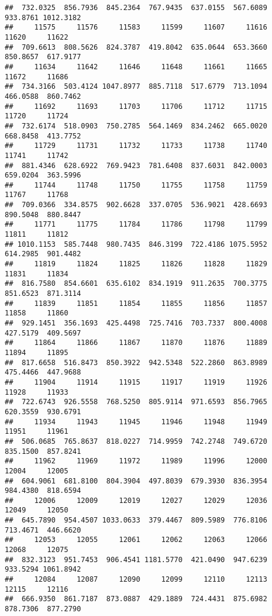 \documentclass[
]{article}
\begin{document}
\begin{verbatim}
##  732.0325  856.7936  845.2364  767.9435  637.0155  567.6089  933.8761 1012.3182 
##     11575     11576     11583     11599     11607     11616     11620     11622 
##  709.6613  808.5626  824.3787  419.8042  635.0644  653.3660  850.8657  617.9177 
##     11634     11642     11646     11648     11661     11665     11672     11686 
##  734.3166  503.4124 1047.8977  885.7118  517.6779  713.1094  466.0588  860.7462 
##     11692     11693     11703     11706     11712     11715     11720     11724 
##  732.6174  518.0903  750.2785  564.1469  834.2462  665.0020  668.8458  413.7752 
##     11729     11731     11732     11733     11738     11740     11741     11742 
##  881.4346  628.6922  769.9423  781.6408  837.6031  842.0003  659.0204  363.5996 
##     11744     11748     11750     11755     11758     11759     11767     11768 
##  709.0366  334.8575  902.6628  337.0705  536.9021  428.6693  890.5048  880.8447 
##     11771     11775     11784     11786     11798     11799     11811     11812 
## 1010.1153  585.7448  980.7435  846.3199  722.4186 1075.5952  614.2985  901.4482 
##     11819     11824     11825     11826     11828     11829     11831     11834 
##  816.7580  854.6601  635.6102  834.1919  911.2635  700.3775  851.6523  871.3114 
##     11839     11851     11854     11855     11856     11857     11858     11860 
##  929.1451  356.1693  425.4498  725.7416  703.7337  800.4008  427.5179  409.5697 
##     11864     11866     11867     11870     11876     11889     11894     11895 
##  817.6658  516.8473  850.3922  942.5348  522.2860  863.8989  475.4466  447.9688 
##     11904     11914     11915     11917     11919     11926     11928     11933 
##  722.6743  926.5558  768.5250  805.9114  971.6593  856.7965  620.3559  930.6791 
##     11934     11943     11945     11946     11948     11949     11951     11961 
##  506.0685  765.8637  818.0227  714.9959  742.2748  749.6720  835.1500  857.8241 
##     11962     11969     11972     11989     11996     12000     12004     12005 
##  604.9061  681.8100  804.3904  497.8039  679.3930  836.3954  984.4380  818.6594 
##     12006     12009     12019     12027     12029     12036     12049     12050 
##  645.7890  954.4507 1033.0633  379.4467  809.5989  776.8106  713.4671  446.6620 
##     12053     12055     12061     12062     12063     12066     12068     12075 
##  832.3123  951.7453  906.4541 1181.5770  421.0490  947.6239  933.5294 1061.8942 
##     12084     12087     12090     12099     12110     12113     12115     12116 
##  666.9350  861.7187  873.0887  429.1889  724.4431  875.6982  878.7306  877.2790 

\end{verbatim}
\end{document}
